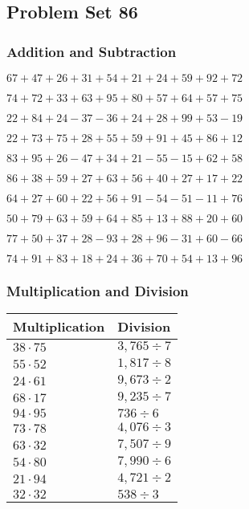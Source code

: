 \hypertarget{problem-set-86}{%
\subsection{Problem Set 86}\label{problem-set-86}}

\hypertarget{addition-and-subtraction}{%
\subsubsection{Addition and
Subtraction}\label{addition-and-subtraction}}

\(67+47+26+31+54+21+24+59+92+72\)

\(74+72+33+63+95+80+57+64+57+75\)

\(22+84+24-37-36+24+28+99+53-19\)

\(22+73+75+28+55+59+91+45+86+12\)

\(83+95+26-47+34+21-55-15+62+58\)

\(86+38+59+27+63+56+40+27+17+22\)

\(64+27+60+22+56+91-54-51-11+76\)

\(50+79+63+59+64+85+13+88+20+60\)

\(77+50+37+28-93+28+96-31+60-66\)

\(74+91+83+18+24+36+70+54+13+96\)

\hypertarget{multiplication-and-division}{%
\subsubsection{Multiplication and
Division}\label{multiplication-and-division}}

\begin{longtable}[]{@{}ll@{}}
\toprule
Multiplication & Division\tabularnewline
\midrule
\endhead
\(38\cdot75\) & \(3,765÷7\)\tabularnewline
\(55\cdot52\) & \(1,817÷8\)\tabularnewline
\(24\cdot61\) & \(9,673÷2\)\tabularnewline
\(68\cdot17\) & \(9,235÷7\)\tabularnewline
\(94\cdot95\) & \(736÷6\)\tabularnewline
\(73\cdot78\) & \(4,076÷3\)\tabularnewline
\(63\cdot32\) & \(7,507÷9\)\tabularnewline
\(54\cdot80\) & \(7,990÷6\)\tabularnewline
\(21\cdot94\) & \(4,721÷2\)\tabularnewline
\(32\cdot32\) & \(538÷3\)\tabularnewline
\bottomrule
\end{longtable}
